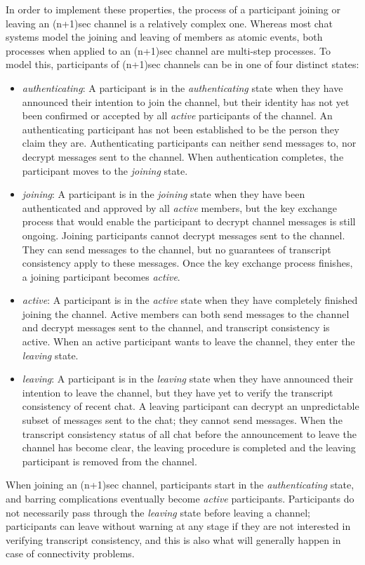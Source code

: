 \documentclass{article}
\begin{document}
In order to implement these properties, the process of a participant joining or leaving an (n+1)sec channel is a relatively complex one.
Whereas most chat systems model the joining and leaving of members as atomic events, both processes when applied to an (n+1)sec channel are multi-step processes.
To model this, participants of (n+1)sec channels can be in one of four distinct states:
\begin{itemize}
\item \emph{authenticating}: A participant is in the \emph{authenticating} state when they have announced their intention to join the channel, but their identity has not yet been confirmed or accepted by all \emph{active} participants of the channel. An authenticating participant has not been established to be the person they claim they are. Authenticating participants can neither send messages to, nor decrypt messages sent to the channel. When authentication completes, the participant moves to the \emph{joining} state.
\item \emph{joining}: A participant is in the \emph{joining} state when they have been authenticated and approved by all \emph{active} members, but the key exchange process that would enable the participant to decrypt channel messages is still ongoing. Joining participants cannot decrypt messages sent to the channel. They can send messages to the channel, but no guarantees of transcript consistency apply to these messages. Once the key exchange process finishes, a joining participant becomes \emph{active}.
\item \emph{active}: A participant is in the \emph{active} state when they have completely finished joining the channel. Active members can both send messages to the channel and decrypt messages sent to the channel, and transcript consistency is active. When an active participant wants to leave the channel, they enter the \emph{leaving} state.
\item \emph{leaving}: A participant is in the \emph{leaving} state when they have announced their intention to leave the channel, but they have yet to verify the transcript consistency of recent chat. A leaving participant can decrypt an unpredictable subset of messages sent to the chat; they cannot send messages. When the transcript consistency status of all chat before the announcement to leave the channel has become clear, the leaving procedure is completed and the leaving participant is removed from the channel.
\end{itemize}
When joining an (n+1)sec channel, participants start in the \emph{authenticating} state, and barring complications eventually become \emph{active} participants.
Participants do not necessarily pass through the \emph{leaving} state before leaving a channel; participants can leave without warning at any stage if they are not interested in verifying transcript consistency, and this is also what will generally happen in case of connectivity problems.
\end{document}
